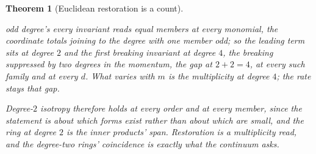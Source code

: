 \documentclass[11pt]{article}
\newtheorem{theorem}{Theorem}
\theoremstyle{definition}
\begin{document}
\begin{theorem}[Euclidean restoration is a count]
\begin{enumerate}[leftmargin=2em,itemsep=1pt]
odd degree's every invariant reads equal members at every monomial, the
coordinate totals joining to the degree with one member odd; so the
leading term sits at degree $2$ and the first breaking invariant at
degree $4$, the breaking suppressed by two degrees in the
momentum, the gap at $2+2=4$, at
every such family and at every $d$. What varies with $m$ is the multiplicity at
degree $4$; the rate stays that gap.
\end{enumerate}
Degree-$2$ isotropy therefore holds at every order and at every member, since the
statement is about which forms exist rather than about which are small,
and the ring at degree $2$ is the inner products' span. Restoration is a multiplicity read, and the degree-two rings'
coincidence is exactly what the continuum asks.

\end{theorem}
\end{document}
